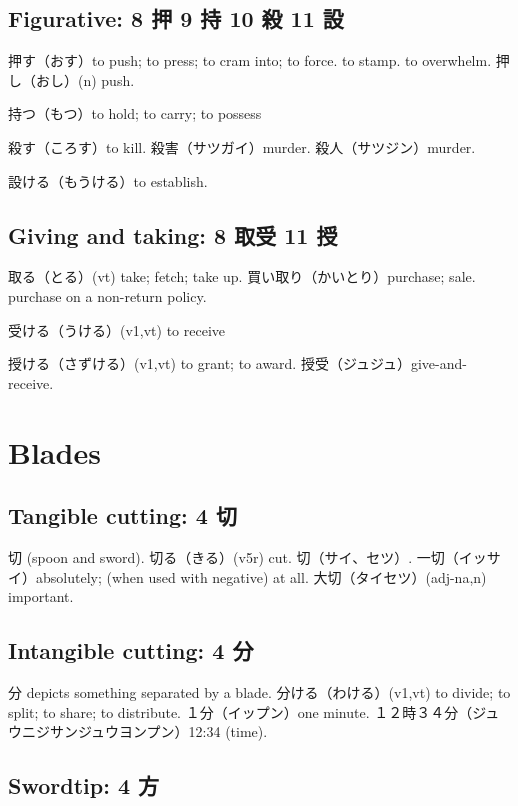 \subsection{Figurative: 8 押 9 持 10 殺 11 設}

押す（おす）to push; to press; to cram into; to force.
to stamp.
to overwhelm.
押し（おし）(n) push.

持つ（もつ）to hold; to carry; to possess

殺す（ころす）to kill.
殺害（サツガイ）murder.
殺人（サツジン）murder.

設ける（もうける）to establish.

\subsection{Giving and taking: 8 取受 11 授}

取る（とる）(vt) take; fetch; take up.
買い取り（かいとり）purchase; sale. purchase on a non-return policy.

受ける（うける）(v1,vt) to receive

授ける（さずける）(v1,vt) to grant; to award.
授受（ジュジュ）give-and-receive.

\section{Blades}

\subsection{Tangible cutting: 4 切}

切 (spoon and sword).
切る（きる）(v5r) cut.
切（サイ、セツ）.
一切（イッサイ）absolutely; (when used with negative) at all.
大切（タイセツ）(adj-na,n) important.

\subsection{Intangible cutting: 4 分}

分 depicts something separated by a blade.
分ける（わける）(v1,vt) to divide; to split; to share; to distribute.
１分（イップン）one minute.
１２時３４分（ジュウニジサンジュウヨンプン）12:34 (time).

\subsection{Swordtip: 4 方}

